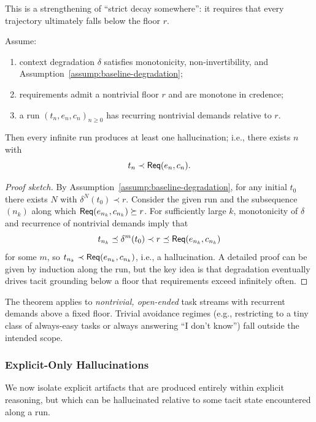 This is a strengthening of ``strict decay somewhere'': it requires that
every trajectory ultimately falls below the floor \(r\).

\begin{theorem}
\label{thm:baseline-inevitability}
Assume:
\begin{enumerate}
  \item context degradation \(\delta\) satisfies monotonicity,
        non-invertibility, and
        Assumption~\ref{assump:baseline-degradation};
  \item requirements admit a nontrivial floor \(r\) and are monotone in
        credence;
  \item a run \((t_n,e_n,c_n)_{n\ge 0}\) has recurring nontrivial
        demands relative to \(r\).
\end{enumerate}
Then every infinite run produces at least one hallucination; i.e., there
exists \(n\) with
\[
t_n \prec \mathsf{Req}(e_n,c_n).
\]
\end{theorem}

\begin{proof}[Proof sketch]
By Assumption~\ref{assump:baseline-degradation}, for any initial
\(t_0\) there exists \(N\) with \(\delta^N(t_0) \prec r\). Consider the
given run and the subsequence \((n_k)\) along which
\(\mathsf{Req}(e_{n_k},c_{n_k})\succeq r\). For sufficiently large \(k\),
monotonicity of \(\delta\) and recurrence of nontrivial demands imply
that
\[
t_{n_k} \preceq \delta^{m}(t_0) \prec r \preceq \mathsf{Req}(e_{n_k},c_{n_k})
\]
for some \(m\), so \(t_{n_k} \prec \mathsf{Req}(e_{n_k},c_{n_k})\), i.e., a
hallucination. A detailed proof can be given by induction along the
run, but the key idea is that degradation eventually drives tacit
grounding below a floor that requirements exceed infinitely often.
\end{proof}

\begin{remark}
The theorem applies to \emph{nontrivial, open-ended} task streams with
recurrent demands above a fixed floor. Trivial avoidance regimes (e.g.,
restricting to a tiny class of always-easy tasks or always answering
``I don't know'') fall outside the intended scope.
\end{remark}

\subsubsection{Explicit-Only Hallucinations}
We now isolate explicit artifacts that are produced entirely within explicit reasoning, but which can be
hallucinated relative to some tacit state encountered along a run.


